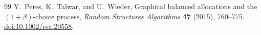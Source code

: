 \documentclass[11pt]{article}
\theoremstyle{remark}
\newcommand{\doi}[1]{\href{https://doi.org/#1}{doi:#1}}
\begin{document}
\begin{thebibliography}{99}
Y.~Peres, K.~Talwar, and U.~Wieder,
\newblock Graphical balanced allocations and the $(1+\beta)$-\allowbreak choice process,
\newblock \emph{Random Structures Algorithms} \textbf{47} (2015), 760--775.
\newblock \doi{10.1002/rsa.20558}.

\end{thebibliography}
\endgroup
\end{document}
